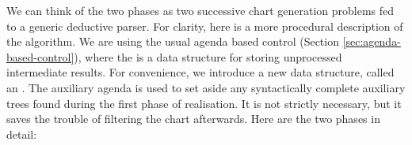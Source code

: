 % 

We can think of the two phases as two successive chart generation
problems fed to a generic deductive parser.  For clarity, here is a more
procedural description of the algorithm.  We are using the usual agenda
based control (Section \ref{sec:agenda-based-control}), where the
 is a data structure for storing unprocessed intermediate
results.  For convenience, we introduce a new data structure, called an
.  The auxiliary agenda is used to set aside
any syntactically complete auxiliary trees found during the first phase
of realisation.  It is not strictly necessary, but it saves the trouble
of filtering the chart afterwards.  Here are the two phases in detail:

